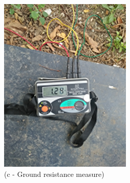 \begin{figure}[!h]
\begin{minipage}[b]{0.3\linewidth}
	\includegraphics[width=\textwidth]{figures/fig_ch04_elecaudit_grounding_resistance}
	\caption*{(c - Ground resistance measure)}
\end{minipage}
	\hspace{0.03cm}
\begin{minipage}[b]{0.3\linewidth}
	\centering

\end{minipage}
\end{figure}
